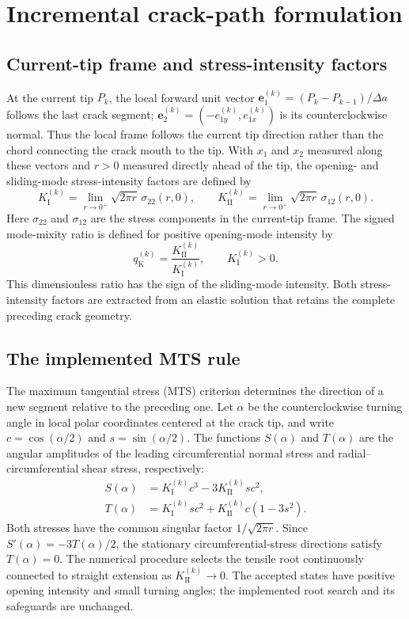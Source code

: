 \documentclass[11pt]{article}
\begin{document}
\section{Incremental crack-path formulation}
\label{sec:recurrence}
\subsection{Current-tip frame and stress-intensity factors}
At the current tip $P_k$, the local forward unit vector
$\bm e_1^{(k)}=(P_k-P_{k-1})/\Delta a$ follows the last crack
segment; $\bm e_2^{(k)}=(-e_{1y}^{(k)},e_{1x}^{(k)})$ is its
counterclockwise normal. Thus the local frame follows the current
tip direction rather than the chord connecting the crack mouth to the
tip. With $x_1$ and $x_2$ measured along these vectors and $r>0$
measured directly ahead of the tip, the opening- and sliding-mode
stress-intensity factors are defined by
\begin{equation}
 K_{\mathrm{I}}^{(k)}=\lim_{r\to0^+}\sqrt{2\pi r}\,\sigma_{22}(r,0),
 \qquad
 K_{\mathrm{II}}^{(k)}=\lim_{r\to0^+}\sqrt{2\pi r}\,\sigma_{12}(r,0).
 \label{eq:sifdefinition}
\end{equation}
Here $\sigma_{22}$ and $\sigma_{12}$ are the stress components in
the current-tip frame. The signed mode-mixity ratio is defined for
positive opening-mode intensity by
\begin{equation}
 q_{\mathrm{K}}^{(k)}
 =\frac{K_{\mathrm{II}}^{(k)}}{K_{\mathrm{I}}^{(k)}},
 \qquad K_{\mathrm{I}}^{(k)}>0.
 \label{eq:mode-mixity}
\end{equation}
This dimensionless ratio has the sign of the sliding-mode intensity.
Both stress-intensity factors are extracted from an elastic solution
that retains the complete preceding crack geometry.

\subsection{The implemented MTS rule}
The maximum tangential stress (MTS) criterion determines the direction
of a new segment relative to the preceding one. Let $\alpha$ be the
counterclockwise turning angle in local polar coordinates centered at
the crack tip, and write $c=\cos(\alpha/2)$ and
$s=\sin(\alpha/2)$. The functions $S(\alpha)$ and $T(\alpha)$ are
the angular amplitudes of the leading circumferential normal stress
and radial--circumferential shear stress, respectively:
\begin{align}
 S(\alpha)&=K_{\mathrm{I}}^{(k)}c^3
             -3K_{\mathrm{II}}^{(k)}s c^2,\label{eq:stt}\\
 T(\alpha)&=K_{\mathrm{I}}^{(k)}s c^2
             +K_{\mathrm{II}}^{(k)}c(1-3s^2).
 \label{eq:trt}
\end{align}
Both stresses have the common singular factor $1/\sqrt{2\pi r}$.
Since $S'(\alpha)=-3T(\alpha)/2$, the stationary circumferential-stress
directions satisfy $T(\alpha)=0$. The numerical procedure selects the
tensile root continuously connected to straight extension as
$K_{\mathrm{II}}^{(k)}\to0$. The accepted states have positive opening
intensity and small turning angles; the implemented root search and
its safeguards are unchanged.
\end{document}
